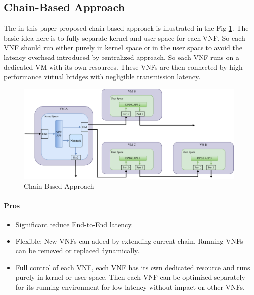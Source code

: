 \documentclass[12pt]{article}
\begin{document}
\subsection{Chain-Based Approach}%
\label{sub:chain_based_approach}

The in this paper proposed chain-based approach is illustrated in the Fig \ref{fig:chain_approach}.
The basic idea here is to fully separate kernel and user space for each VNF. So each VNF should run either purely in
kernel space or in the user space to avoid the latency overhead introduced by centralized approach.
So each VNF runs on a dedicated VM with its own resources. These VNFs are then connected by high-performance virtual
bridges with negligible transmission latency.

\begin{figure}[htpb]
    \centering
    \includegraphics[width=1\linewidth]{./figures/chain_approach.pdf}
    \caption{Chain-Based Approach}
    \label{fig:chain_approach}
\end{figure}

\paragraph{Pros}
\begin{itemize}
    \item Significant reduce End-to-End latency.
    \item Flexible: New VNFs can added by extending current chain. Running VNFs can be removed or replaced dynamically.
    \item Full control of each VNF, each VNF has its own dedicated resource and runs purely in kernel or user space.
        Then each VNF can be optimized separately for its running environment for low latency without impact on other VNFs.
\end{itemize}
\end{document}
